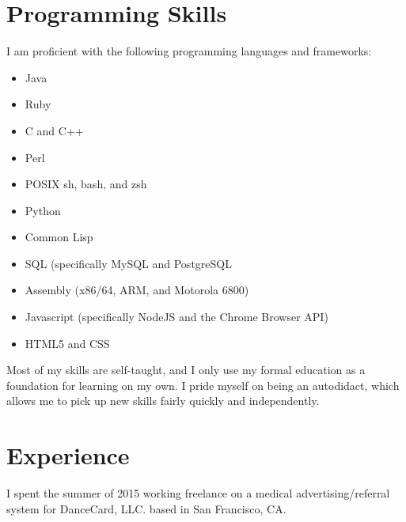 \documentclass{article}
\begin{document}
\begin{singlespace}
\begin{flushleft}
  \section*{Programming Skills}
  I am proficient with the following programming languages and frameworks:
  \begin{itemize}
  \item Java
  \item Ruby
  \item C and C++
  \item Perl
  \item POSIX sh, bash, and zsh
  \item Python
  \item Common Lisp
  \item SQL (specifically MySQL and PostgreSQL
  \item Assembly (x86/64, ARM, and Motorola 6800)
  \item Javascript (specifically NodeJS and the Chrome Browser API)
  \item HTML5 and CSS
  \end{itemize}
  Most of my skills are self-taught, and I only use my formal education as a foundation for learning on my own. I pride myself on being an autodidact, which allows me to pick up new skills fairly quickly and independently.
  \section*{Experience}
  I spent the summer of 2015 working freelance on a medical advertising/referral system for DanceCard, LLC. based in San Francisco, CA.
\end{flushleft}
\end{singlespace}
\end{document}
